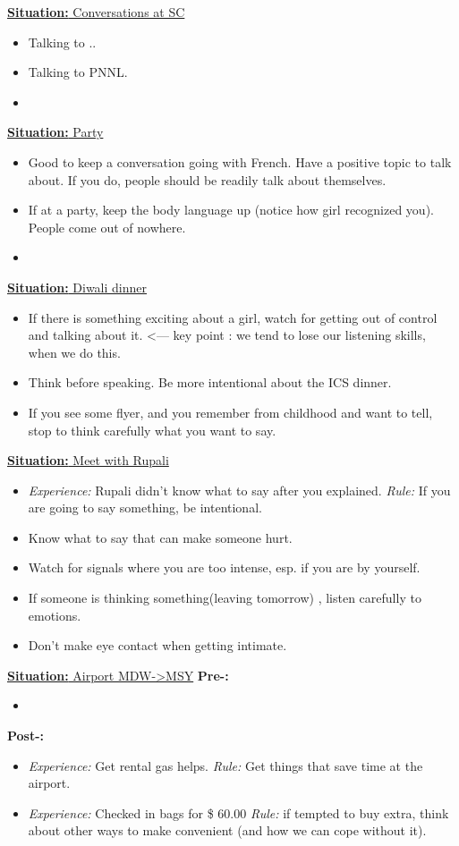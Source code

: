 \documentclass[11pt]{article}
\newcommand{\newSituation}[1]{\underline{\textbf{Situation:} #1} }
\begin{document}
\newSituation{Conversations at SC}
\begin{itemize} 
\item Talking to .. 
\item Talking to PNNL. 
\item 
\end{itemize} 

\newSituation{Party }
\begin{itemize} 
\item Good to keep a conversation going with French. Have a positive topic to talk about. If you do, people should be readily talk about themselves. 
\item If at a party, keep the body language up (notice how girl recognized you). People come out of nowhere. 
\item 
\end{itemize} 

\newSituation{Diwali dinner} 

\begin{itemize} 
\item If there is something exciting about a girl, watch for getting out of control and talking about it. <--- key point : we tend to lose our listening skills, when we do this. 
\item Think before speaking. Be more intentional about the ICS dinner. 
\item If you see some flyer, and you remember from childhood and want to tell, stop to think carefully what you want to say. 
\end{itemize} 

\newSituation{Meet with Rupali} 
\begin{itemize} 
\item \textit{Experience:} Rupali didn't know what to say after you explained.  \textit{Rule:} If you are going to say something, be intentional. 
\item Know what to say that can make someone hurt. 
\item Watch for signals where you are too intense, esp. if you are by yourself. 
\item If someone is thinking something(leaving tomorrow) , listen carefully to emotions. 
\item Don't make eye contact when getting intimate. 
\end{itemize} 

\newSituation{Airport MDW->MSY} 
\textbf{Pre-:}
\begin{itemize} 
\item 
\end{itemize} 
\textbf{Post-:}
\begin{itemize} 
\item \textit{Experience:} Get rental gas helps. \textit{Rule:} Get things that save time at the airport. 
\item \textit{Experience:} Checked in bags for \$ 60.00 \textit{Rule:} if tempted to buy extra, think about other ways to make convenient (and how we can cope without it). 
\end{itemize} 
\end{document}
